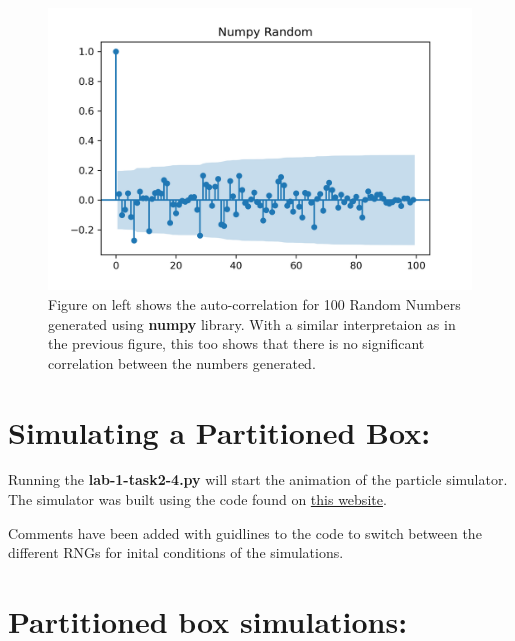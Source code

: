 \documentclass{article}
\begin{document}
    \begin{figure}
        \begin{minipage}[c]{0.5\textwidth}
        \includegraphics[width=\textwidth]{task1a2.png}
        \end{minipage}\hfill
        \begin{minipage}[c]{0.5\textwidth}
        \caption{
            Figure on left shows the auto-correlation for 100 Random Numbers generated using
            \textbf{numpy} library. With a similar interpretaion as in the previous figure, this
            too shows that there is no significant correlation between the numbers generated.
        } \label{fig:2b}
        \end{minipage}
    \end{figure}

\section{Simulating a Partitioned Box:}

Running the \textbf{lab-1-task2-4.py} will start the animation of the particle simulator. The 
simulator was built using the code found on 
\href{https://scipython.com/blog/the-maxwellboltzmann-distribution-in-two-dimensions/}{this website}.

\noindent
Comments have been added with guidlines to the code to switch between the different RNGs 
for inital conditions of the simulations.

\section{Partitioned box simulations:}
\end{document}

